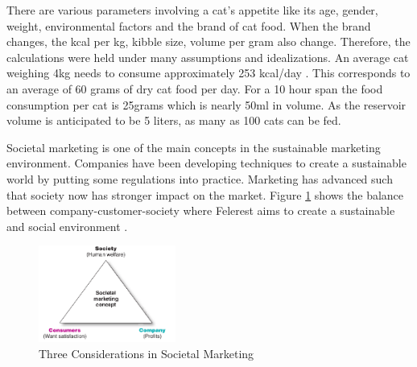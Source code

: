 There are various parameters involving a cat's appetite like its age, gender, weight, environmental factors and the brand of cat food. When the brand changes, the kcal per kg, kibble  size, volume per gram also change. Therefore, the calculations were held under many assumptions and idealizations. An average cat weighing 4kg needs to consume approximately 253 kcal/day \cite{cite:DIET}. This corresponds to an average of 60 grams of dry cat food per day. For a 10 hour span the food consumption per cat is 25grams which is nearly 50ml in volume. As the reservoir volume is anticipated to be 5 liters, as many as 100 cats can be fed. 



Societal marketing is one of the main concepts in the sustainable marketing environment. Companies have been developing techniques to create a sustainable world by putting some regulations into practice. Marketing has advanced such that society now has stronger impact on the market. Figure \ref{fig:intro_societalMarketing} shows the balance between company-customer-society where Felerest aims to create a sustainable and social environment \cite{bib:intro_societalMarketing}.


\begin{figure}
    \centering
    \includegraphics[width=0.4\textwidth]{img/intro_societalMarketingTriangle.png}
    \caption{\scriptsize Three Considerations in Societal Marketing \cite{bib:intro_societalMarketing}}
    \label{fig:intro_societalMarketing}
\end{figure}

